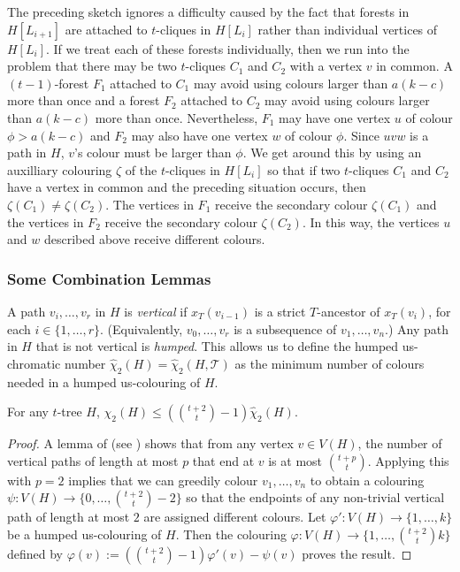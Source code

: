 \documentclass[kpfonts]{patmorin}
\newcommand{\uqs}{\chi_2}
\newcommand{\hus}{\hat{\chi}_2}
\theoremstyle{named}
\begin{document}
The preceding sketch ignores a difficulty caused by the fact that forests in $H[L_{i+1}]$ are attached to $t$-cliques in $H[L_i]$ rather than individual vertices of $H[L_i]$.  If we treat each of these forests individually, then we run into the problem that there may be two $t$-cliques $C_1$ and $C_2$ with a vertex $v$ in common.  A $(t-1)$-forest $F_1$ attached to $C_1$ may avoid using colours larger than $a(k-c)$ more than once and a forest $F_2$ attached to $C_2$ may avoid using colours larger than $a(k-c)$ more than once.  Nevertheless, $F_1$ may have one vertex $u$ of colour $\phi >a(k-c)$ and $F_2$ may also have one vertex $w$ of colour $\phi$.  Since $uvw$ is a path in $H$, $v$'s colour must be larger than $\phi$.  We get around this by using an auxilliary colouring $\zeta$ of the $t$-cliques in $H[L_i]$ so that if two $t$-cliques $C_1$ and $C_2$ have a vertex in common and the preceding situation occurs, then $\zeta(C_1)\neq \zeta(C_2)$.  The vertices in $F_1$ receive the secondary colour $\zeta(C_1)$ and the vertices in $F_2$ receive the secondary colour $\zeta(C_2)$.  In this way, the vertices $u$ and $w$ described above receive different colours.

\subsubsection{Some Combination Lemmas}

A path $v_i,\ldots,v_r$ in $H$ is \emph{vertical} if $x_T(v_{i-1})$ is a strict $T$-ancestor of $x_T(v_i)$, for each $i\in\{1,\ldots,r\}$. (Equivalently, $v_0,\ldots,v_r$ is a subsequence of $v_1,\ldots,v_n$.) Any path in $H$ that is not vertical is \emph{humped}.  This allows us to define the humped us-chromatic number $\hus(H)=\hus(H,\mathcal{T})$ as the minimum number of colours needed in a humped us-colouring of $H$.

\begin{lem}\label{humped}
    For any $t$-tree $H$, $\uqs(H)\le (\binom{t+2}{t}-1)\hus(H)$.
\end{lem}

\begin{proof}
    A lemma of \citet{pilipczuk.siebertz:polynomial} (see \cite[Lemma~13]{pilipczuk.siebertz:polynomial-arxiv}) shows that from any vertex $v\in V(H)$, the number of vertical paths of length at most $p$ that end at $v$ is at most $\binom{t+p}{t}$.  Applying this with $p=2$ implies that we can greedily colour $v_1,\ldots,v_n$ to obtain a colouring $\psi:V(H)\to \{0,\ldots,\binom{t+2}{t}-2\}$ so that the endpoints of any non-trivial vertical path of length at most $2$ are assigned different colours.  Let $\varphi':V(H)\to\{1,\ldots,k\}$ be a humped us-colouring of $H$.  Then the colouring $\varphi:V(H)\to\{1,\ldots,\binom{t+2}{t}k\}$ defined by $\varphi(v):=(\binom{t+2}{t}-1)\varphi'(v)-\psi(v)$ proves the result.
\end{proof}
\end{document}
